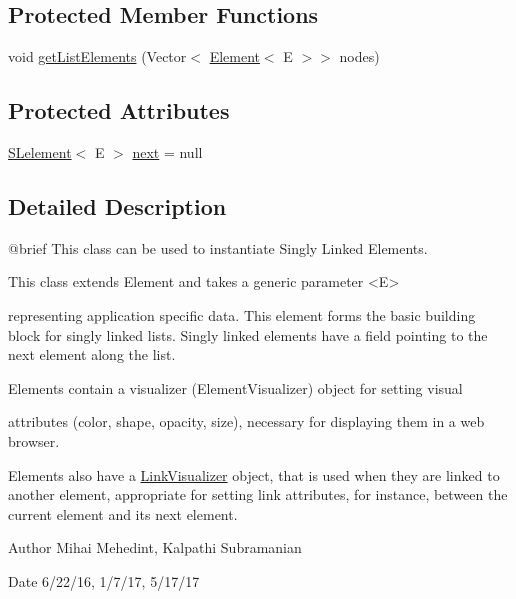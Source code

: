 \subsection*{Protected Member Functions}
\begin{DoxyCompactItemize}
\item 
void \mbox{\hyperlink{classbridges_1_1base_1_1_s_lelement_abadffea339171349a8e86ded9cd3fe21}{get\+List\+Elements}} (Vector$<$ \mbox{\hyperlink{classbridges_1_1base_1_1_element}{Element}}$<$ E $>$$>$ nodes)
\end{DoxyCompactItemize}
\subsection*{Protected Attributes}
\begin{DoxyCompactItemize}
\item 
\mbox{\hyperlink{classbridges_1_1base_1_1_s_lelement}{S\+Lelement}}$<$ E $>$ \mbox{\hyperlink{classbridges_1_1base_1_1_s_lelement_abf61c96a74ad319d561c6952ea388e0e}{next}} = null
\end{DoxyCompactItemize}


\subsection{Detailed Description}
\begin{DoxyVerb}@brief This class can be used to instantiate Singly Linked Elements.

This class extends Element and takes a generic parameter <E>
\end{DoxyVerb}
 representing application specific data. This element forms the basic building block for singly linked lists. Singly linked elements have a field pointing to the next element along the list.

\begin{DoxyVerb}Elements contain a visualizer (ElementVisualizer) object for setting visual
\end{DoxyVerb}
 attributes (color, shape, opacity, size), necessary for displaying them in a web browser.

Elements also have a \mbox{\hyperlink{classbridges_1_1base_1_1_link_visualizer}{Link\+Visualizer}} object, that is used when they are linked to another element, appropriate for setting link attributes, for instance, between the current element and its next element.

\begin{DoxyAuthor}{Author}
Mihai Mehedint, Kalpathi Subramanian
\end{DoxyAuthor}
\begin{DoxyDate}{Date}
6/22/16, 1/7/17, 5/17/17
\end{DoxyDate}

